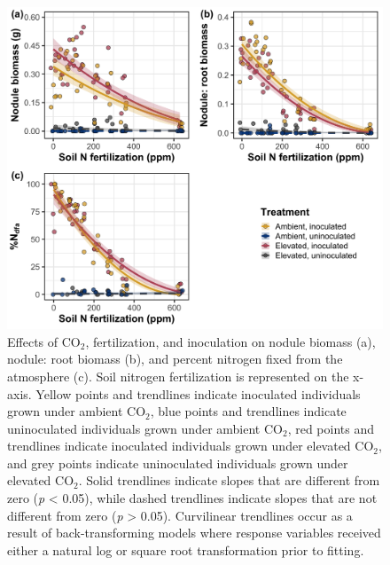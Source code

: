 \newpage
\begin{figure}
    \centering
    \includegraphics[scale = 0.075]{ch5_NxCO2xI/figs/NxCO2xI_fig5_nFix.png}
    \caption[Effects of CO$_2$, fertilization, and inoculation on nodule biomass, nodule: root biomass, and percent nitrogen fixed from the atmosphere.]{Effects of CO$_2$, fertilization, and inoculation on nodule biomass (a), nodule: root biomass (b), and percent nitrogen fixed from the atmosphere (c). Soil nitrogen fertilization is represented on the x-axis. Yellow points and trendlines indicate inoculated individuals grown under ambient CO$_2$, blue points and trendlines indicate uninoculated individuals grown under ambient CO$_2$, red points and trendlines indicate inoculated individuals grown under elevated CO$_2$, and grey points indicate uninoculated individuals grown under elevated CO$_2$. Solid trendlines indicate slopes that are different from zero (\textit{p} < 0.05), while dashed trendlines indicate slopes that are not different from zero (\textit{p} > 0.05). Curvilinear trendlines occur as a result of back-transforming models where response variables received either a natural log or square root transformation prior to fitting. }
    \label{fig:figure5.5}
\end{figure}
\clearpage

